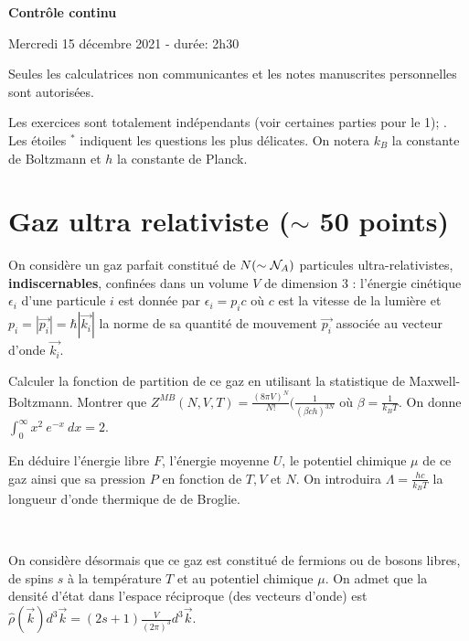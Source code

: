 \documentclass[utf8, 11pt]{feuille}
\begin{document}
\begin{center}
    \Large {\bf Contrôle continu}
    
    Mercredi 15 décembre 2021 - durée: 2h30
\end{center}

Seules les calculatrices non communicantes et les notes manuscrites personnelles sont autorisées.

Les exercices sont totalement indépendants (voir certaines parties pour le 1); . Les étoiles $^*$ indiquent les questions les plus délicates. On notera $k_B$ la constante de Boltzmann et $h$ la constante de Planck.


%




\section{Gaz ultra relativiste ($\sim$ 50 points) }

On considère un gaz parfait constitué de $N (\sim {\cal N}_A)$ particules ultra-relativistes, {\bf indiscernables}, confinées dans un volume $V$ de dimension 3 : l'énergie cinétique $\epsilon_i$ d'une particule $i$ est donnée par $\epsilon_i= p_ic$ où $c$ est la vitesse de la lumière et $p_i=|\Vec{p_i}|=\hbar |\Vec{k_i}|$ la norme de sa quantité de mouvement $\Vec{p_i}$ associée au vecteur d'onde $\Vec{k_i}$.  

\medskip

\question Calculer la fonction de partition de ce gaz en utilisant la statistique de Maxwell-Boltzmann. Montrer que $Z^{MB}(N,V,T)=\frac{(8 \pi V)^N}{N!} (\frac{1}{(\beta c h)^{3N}}$ où $\beta=\frac{1}{k_BT}$. On donne $\int_0^{\infty} x^2 \ e^{-x} \ dx =2.$

\question En déduire l'énergie libre $F$, l'énergie moyenne $U$, le potentiel chimique $\mu$ de ce gaz ainsi que sa pression $P$ en fonction de $T, V$ et $N$. On introduira $\Lambda=\frac{hc}{k_BT}$ la longueur d'onde thermique de de Broglie.

\ 

On considère désormais que ce gaz est constitué de fermions ou de bosons libres, de spins $s$ à la température $T$ et au potentiel chimique $\mu$. On admet que la densité d'état dans l'espace réciproque (des vecteurs d'onde) est $\hat{\rho}(\Vec{k})d^3 \Vec{k}=(2s+1) \frac{V}{(2 \pi)^3} d^3 \Vec{k}$.
\end{document}
